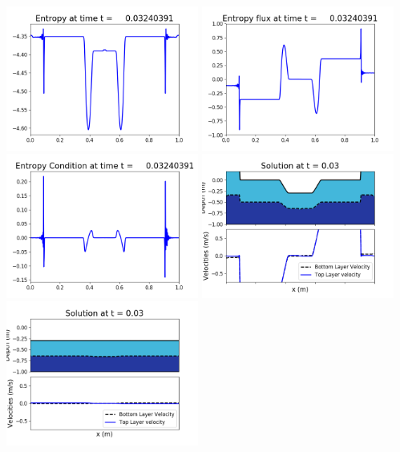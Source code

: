 \documentclass[11pt]{article}
\begin{document}
\vskip 10pt 
\includegraphics[width=0.475\textwidth]{frame0075fig1007.png}
\includegraphics[width=0.475\textwidth]{frame0075fig1008.png}
\vskip 10pt 
\includegraphics[width=0.475\textwidth]{frame0075fig1009.png}
\vskip 10pt 
\includegraphics[width=0.475\textwidth]{frame0076fig1001.png}
\includegraphics[width=0.475\textwidth]{frame0076fig1002.png}
\end{document}
